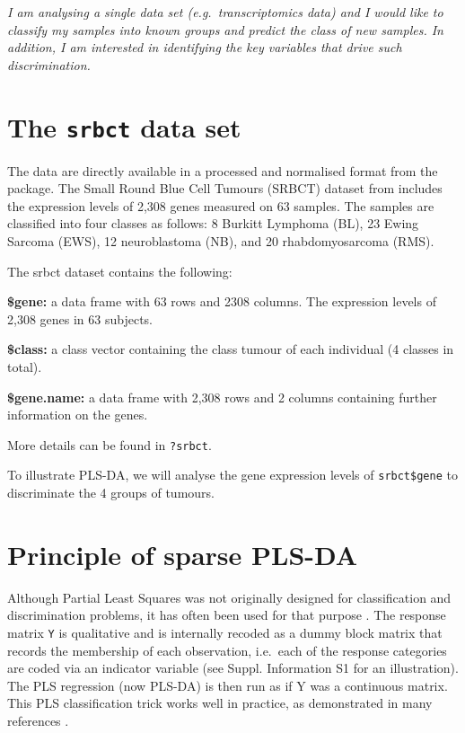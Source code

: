 \documentclass[]{book}
\theoremstyle{definition}
\theoremstyle{definition}
\theoremstyle{definition}
\theoremstyle{remark}
\begin{document}
{ \emph{I am analysing a single data set (e.g.~transcriptomics data) and
I would like to classify my samples into known groups and predict the
class of new samples. In addition, I am interested in identifying the
key variables that drive such discrimination.} }

\section{\texorpdfstring{The \texttt{srbct} data
set}{The srbct data set}}\label{the-srbct-data-set}

The data are directly available in a processed and normalised format
from the package. The Small Round Blue Cell Tumours (SRBCT) dataset from
\citep{Kha01} includes the expression levels of 2,308 genes measured on
63 samples. The samples are classified into four classes as follows: 8
Burkitt Lymphoma (BL), 23 Ewing Sarcoma (EWS), 12 neuroblastoma (NB),
and 20 rhabdomyosarcoma (RMS).

The srbct dataset contains the following:

\textbf{\$gene:} a data frame with 63 rows and 2308 columns. The
expression levels of 2,308 genes in 63 subjects.

\textbf{\$class:} a class vector containing the class tumour of each
individual (4 classes in total).

\textbf{\$gene.name:} a data frame with 2,308 rows and 2 columns
containing further information on the genes.

More details can be found in \texttt{?srbct}.

To illustrate PLS-DA, we will analyse the gene expression levels of
\texttt{srbct\$gene} to discriminate the 4 groups of tumours.

\section{Principle of sparse PLS-DA}\label{principle-of-sparse-pls-da}

Although Partial Least Squares was not originally designed for
classification and discrimination problems, it has often been used for
that purpose \citep{Ngu02a, Tan04}. The response matrix \texttt{Y} is
qualitative and is internally recoded as a dummy block matrix that
records the membership of each observation, i.e.~each of the response
categories are coded via an indicator variable (see \citep{mixomics}
Suppl. Information S1 for an illustration). The PLS regression (now
PLS-DA) is then run as if Y was a continuous matrix. This PLS
classification trick works well in practice, as demonstrated in many
references \citep{Bar03, Ngu02a, Bou07, Chung10}.
\end{document}
